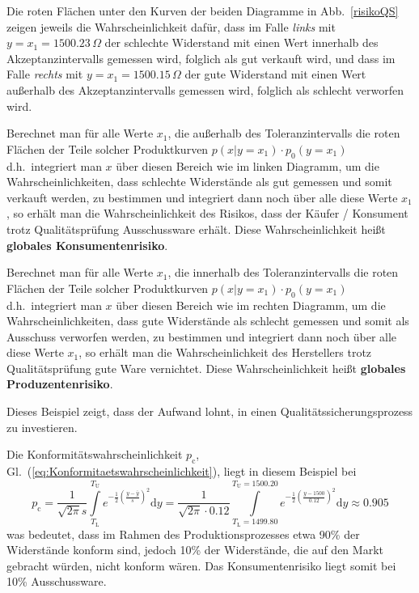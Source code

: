 Die roten Flächen unter den Kurven der beiden Diagramme in Abb.~\ref{risikoQS}
zeigen jeweils die Wahrscheinlichkeit dafür, dass im Falle \textsl{links} mit
$y = x_1 = 1500.23 \, \Omega$ der schlechte Widerstand mit einen Wert innerhalb des
Akzeptanzintervalls gemessen wird, folglich als gut verkauft wird, und dass im Falle \textsl{rechts} mit
$y = x_1 = 1500.15 \, \Omega$ der gute Widerstand mit einen Wert außerhalb des
Akzeptanzintervalls gemessen wird, folglich als schlecht verworfen wird.

Berechnet man für alle Werte $x_1$, die außerhalb des Toleranzintervalls die roten
Flächen der Teile solcher Produktkurven $p(x | y=x_1) \cdot p_0(y=x_1)$ d.h.\ integriert
man $x$ über diesen Bereich wie im linken Diagramm,
 um die Wahrscheinlichkeiten, dass schlechte Widerstände als gut
gemessen und somit verkauft werden, zu bestimmen und integriert dann noch
über alle diese Werte $x_1$, so erhält man die Wahrscheinlichkeit des Risikos, dass
der Käufer / Konsument  trotz Qualitätsprüfung Ausschussware erhält. Diese
Wahrscheinlichkeit heißt \textbf{globales Konsumentenrisiko}.

Berechnet man für alle Werte $x_1$, die innerhalb des Toleranzintervalls die roten
Flächen der Teile solcher Produktkurven $p(x | y=x_1) \cdot p_0(y=x_1)$ d.h.\ integriert
man $x$ über diesen Bereich wie im rechten Diagramm,
 um die Wahrscheinlichkeiten, dass gute Widerstände als schlecht
gemessen und somit als Ausschuss verworfen werden, zu bestimmen und integriert dann noch
über alle diese Werte $x_1$, so erhält man die Wahrscheinlichkeit des Herstellers
trotz Qualitätsprüfung gute Ware vernichtet. Diese
Wahrscheinlichkeit heißt \textbf{globales Produzentenrisiko}.

Dieses Beispiel zeigt, dass der Aufwand lohnt, in einen Qualitätssicherungsprozess zu investieren.

Die Konformitätswahrscheinlichkeit $p_\mathrm{c}$, Gl.~(\ref{eq:Konformitaetswahrscheinlichkeit}), liegt in diesem Beispiel bei
\[
	p_\mathrm{c} = \frac{1}{\sqrt{2 \pi} s} \int\limits_{T_\mathrm{L}}^{T_\mathrm{U}}
e^{-\frac{1}{2}\left(\frac{y - \bar y}{s}\right)^2} \mathrm{d}y  =
\frac{1}{\sqrt{2 \pi} \cdot 0.12} \int\limits_{T_\mathrm{L}=1499.80}^{T_\mathrm{U}=1500.20}
e^{-\frac{1}{2}\left(\frac{y - 1500}{0.12}\right)^2} \mathrm{d}y  \approx 0.905
\]
was bedeutet, dass im Rahmen des Produktionsprozesses etwa 90\% der Widerstände konform sind,
jedoch 10\% der Widerstände, die auf den Markt gebracht würden, nicht konform wären. Das Konsumentenrisiko
liegt somit bei 10\% Ausschussware.

